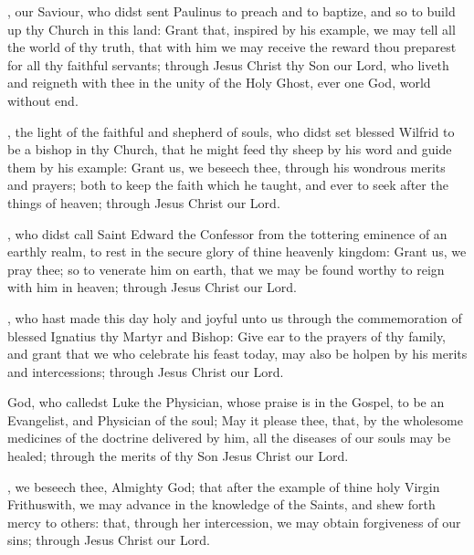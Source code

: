 , our Saviour, who didst sent Paulinus to preach and to baptize, and so to build up thy Church in this land: Grant that, inspired by his example, we may tell all the world of thy truth, that with him we may receive the reward thou preparest for all thy faithful servants; through Jesus Christ thy Son our Lord, who liveth and reigneth with thee in the unity of the Holy Ghost, ever one God, world without end.

, the light of the faithful and shepherd of souls, who didst set blessed Wilfrid to be a bishop in thy Church, that he might feed thy sheep by his word and guide them by his example: Grant us, we beseech thee, through his wondrous merits and prayers; both to keep the faith which he taught, and ever to seek after the things of heaven; through Jesus Christ our Lord.

, who didst call Saint Edward the Confessor from the tottering eminence of an earthly realm, to rest in the secure glory of thine heavenly kingdom: Grant us, we pray thee; so to venerate him on earth, that we may be found worthy to reign with him in heaven; through Jesus Christ our Lord.

, who hast made this day holy and joyful unto us through the commemoration of blessed Ignatius thy Martyr and Bishop: Give ear to the prayers of thy family, and grant that we who celebrate his feast today, may also be holpen by his merits and intercessions; through Jesus Christ our Lord.

 God, who calledst Luke the Physician, whose praise is in the Gospel, to be an Evangelist, and Physician of the soul; May it please thee, that, by the wholesome medicines of the doctrine delivered by him, all the diseases of our souls may be healed; through the merits of thy Son Jesus Christ our Lord.

, we beseech thee, Almighty God; that after the example of thine holy Virgin Frithuswith, we may advance in the knowledge of the Saints, and shew forth mercy to others: that, through her intercession, we may obtain forgiveness of our sins; through Jesus Christ our Lord.

